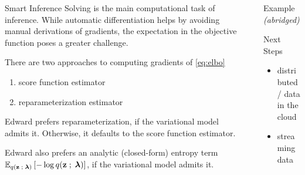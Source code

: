 \documentclass{beamer}
\begin{document}
\begin{frame}[t]
\begin{columns}[t,totalwidth=10in]
\begin{column}{\onecolwid}
\begin{block}{Smart Inference}
Solving  is the main computational task of inference. While
automatic differentiation helps by avoiding manual derivations of gradients, the
expectation in the objective function poses a greater challenge.\newline

There are two approaches to computing gradients of \cref{eq:elbo}
\begin{enumerate}
  \item score function estimator \hfill {}
  \item reparameterization estimator \hfill {}\newline
\end{enumerate}

Edward prefers reparameterization, if the variational model admits it.
Otherwise, it defaults to the score function estimator.\newline

Edward also prefers an analytic (closed-form) entropy term
$\mathbb{E}_{q(\boldsymbol{\mathbf{z}}\;;\;\boldsymbol{\mathbf{\lambda}})} \left[-\log q(\boldsymbol{\mathbf{z}}\;;\;\boldsymbol{\mathbf{\lambda}})\right]$, 
if the variational model admits it.
\end{block}

\end{column} 

\begin{column}{\sepwid}\end{column} %

\begin{column}{\onecolwid} 

\begin{block}{Example \emph{(abridged)}}
\begin{figure}[h]

\end{figure}
\end{block}

\begin{block}{Next Steps}
\\
\begin{itemize}
  \item distributed / data in the cloud
  \item streaming data
\end{itemize}


\end{block}
\end{column}
\end{columns}
\end{frame}
\end{document}
